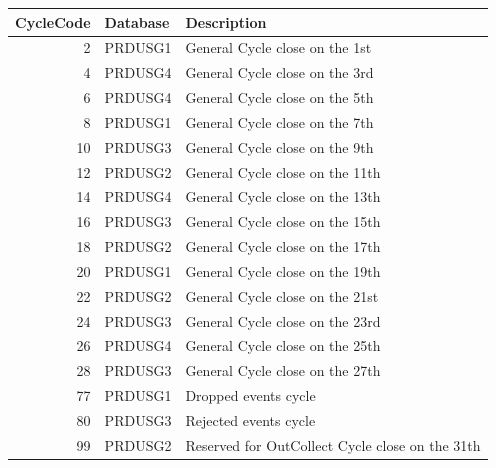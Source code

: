 \documentclass[12pt,twoside]{article}
\begin{document}
\begin{center}
\begin{tabular}{rll}
\hline
 \textbf{CycleCode}  &  \textbf{Database}  &  \textbf{Description}                             \\
\hline
                  2  &  PRDUSG1            &  General Cycle close on the 1st                   \\
                  4  &  PRDUSG4            &  General Cycle close on the 3rd                   \\
                  6  &  PRDUSG4            &  General Cycle close on the 5th                   \\
                  8  &  PRDUSG1            &  General Cycle close on the 7th                   \\
                 10  &  PRDUSG3            &  General Cycle close on the 9th                   \\
                 12  &  PRDUSG2            &  General Cycle close on the 11th                  \\
                 14  &  PRDUSG4            &  General Cycle close on the 13th                  \\
                 16  &  PRDUSG3            &  General Cycle close on the 15th                  \\
                 18  &  PRDUSG2            &  General Cycle close on the 17th                  \\
                 20  &  PRDUSG1            &  General Cycle close on the 19th                  \\
                 22  &  PRDUSG2            &  General Cycle close on the 21st                  \\
                 24  &  PRDUSG3            &  General Cycle close on the 23rd                  \\
                 26  &  PRDUSG4            &  General Cycle close on the 25th                  \\
                 28  &  PRDUSG3            &  General Cycle close on the 27th                  \\
                 77  &  PRDUSG1            &  Dropped events cycle                             \\
                 80  &  PRDUSG3            &  Rejected events cycle                            \\
                 99  &  PRDUSG2            &  Reserved for OutCollect Cycle close on the 31th  \\

\end{tabular}
\end{center}
\end{document}
